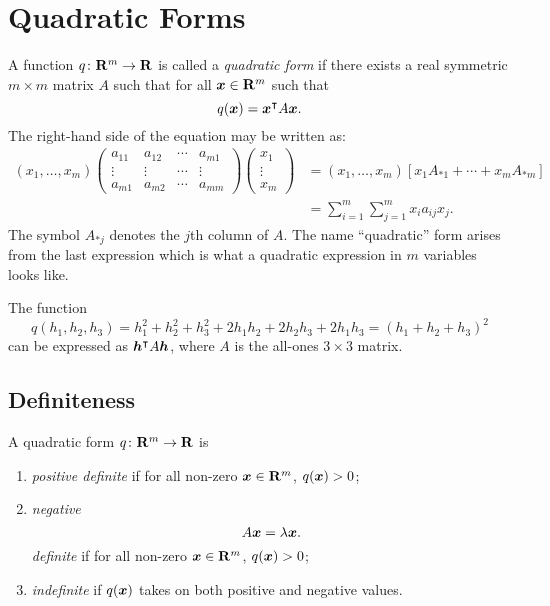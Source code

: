 \section{Quadratic Forms}

A function $q \colon \mathbf{R}^m \rightarrow \mathbf{R}$ is called a \emph{quadratic form} 
if there exists a real symmetric $m \times m$ matrix $A$ such that for all 
$\boldsymbol{x} \in \mathbf{R}^m$ such that
\[
	q(\boldsymbol{x}) = \boldsymbol{x}^{\intercal} A \boldsymbol{x}.
\]
The right-hand side of the equation may be written as:
\begin{align*}
(x_1, \ldots, x_m) \begin{pmatrix} 
						a_{11} & a_{12} & \cdots & a_{m 1} \\
						\vdots & \vdots & \cdots & \vdots \\
						a_{m1} & a_{m2} & \cdots & a_{mm} 	
                   \end{pmatrix} 
				   \begin{pmatrix}
						x_1 \\
						\vdots \\
						x_m
				   \end{pmatrix} & = (x_1, \ldots, x_m) [x_1 A_{* 1} + \cdots + x_m A_{* m}] \\
								 & = \sum_{i = 1}^m \sum_{j = 1}^m x_i a_{ij} x_j.
\end{align*} 
The symbol $A_{* j}$ denotes the $j$th column of $A$. The name ``quadratic'' form arises 
from the last expression which is what a quadratic expression in $m$ variables looks like.
\begin{example}
The function 
\[
	q(h_1, h_2, h_3) = h_1^2 + h_2^2 + h_3^2 + 2h_1h_2 + 2h_2h_3 + 2h_1h_3 = (h_1 + h_2 + h_3)^2
\]
can be expressed as $\boldsymbol{h}^{\intercal} A \boldsymbol{h}$, where $A$ is the all-ones $3 \times 3$ matrix. 
\end{example}

\subsection{Definiteness}
A quadratic form $q \colon \mathbf{R}^m \rightarrow \mathbf{R}$ is 
\begin{enumerate}
	\item \emph{positive definite} if for all non-zero $\boldsymbol{x} \in \mathbf{R}^m$, $q(\boldsymbol{x}) > 0$;
	\item \emph{negative\begin{equation}
	A \boldsymbol{x} =  \lambda \boldsymbol{x}.
\end{equation}
 definite} if for all non-zero $\boldsymbol{x} \in \mathbf{R}^m$, $q(\boldsymbol{x}) > 0$;
	\item \emph{indefinite} if $q(\boldsymbol{x})$ takes on both positive and negative values.  
\end{enumerate}

